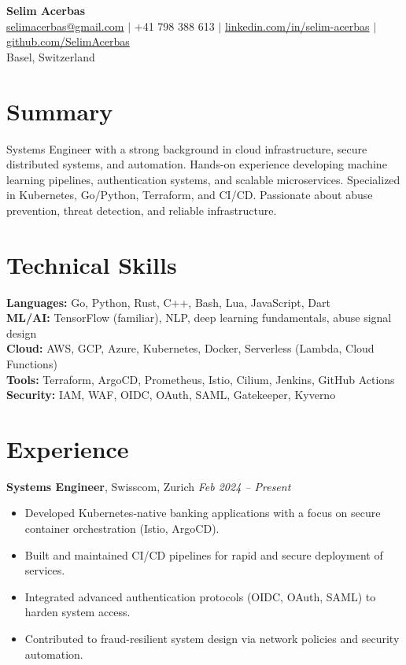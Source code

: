 \documentclass[a4paper,10pt]{article}
\begin{document}
\begin{center}
    {\LARGE \textbf{Selim Acerbas}} \\[4pt]
    \href{mailto:selimacerbas@gmail.com}{selimacerbas@gmail.com} $\vert$
    +41 798 388 613 $\vert$
    \href{https://linkedin.com/in/selim-acerbas-746a031ba}{linkedin.com/in/selim-acerbas} $\vert$
    \href{https://github.com/SelimAcerbas}{github.com/SelimAcerbas} \\
    Basel, Switzerland
\end{center}

\section*{Summary}
Systems Engineer with a strong background in cloud infrastructure, secure distributed systems, and automation. Hands-on experience developing machine learning pipelines, authentication systems, and scalable microservices. Specialized in Kubernetes, Go/Python, Terraform, and CI/CD. Passionate about abuse prevention, threat detection, and reliable infrastructure.

\section*{Technical Skills}
\textbf{Languages:} Go, Python, Rust, C++, Bash, Lua, JavaScript, Dart \\
\textbf{ML/AI:} TensorFlow (familiar), NLP, deep learning fundamentals, abuse signal design \\
\textbf{Cloud:} AWS, GCP, Azure, Kubernetes, Docker, Serverless (Lambda, Cloud Functions) \\
\textbf{Tools:} Terraform, ArgoCD, Prometheus, Istio, Cilium, Jenkins, GitHub Actions \\
\textbf{Security:} IAM, WAF, OIDC, OAuth, SAML, Gatekeeper, Kyverno

\section*{Experience}
\textbf{Systems Engineer}, Swisscom, Zurich \hfill \textit{Feb 2024 -- Present} \\
\vspace{-6pt}
\begin{itemize}
    \item Developed Kubernetes-native banking applications with a focus on secure container orchestration (Istio, ArgoCD).
    \item Built and maintained CI/CD pipelines for rapid and secure deployment of services.
    \item Integrated advanced authentication protocols (OIDC, OAuth, SAML) to harden system access.
    \item Contributed to fraud-resilient system design via network policies and security automation.
\end{itemize}
\end{document}

